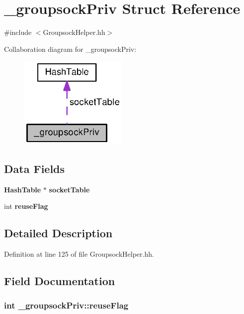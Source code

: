 \section{\+\_\+groupsock\+Priv Struct Reference}
\label{struct__groupsockPriv}


{\ttfamily \#include $<$Groupsock\+Helper.\+hh$>$}



Collaboration diagram for \+\_\+groupsock\+Priv\+:
\nopagebreak
\begin{figure}[H]
\begin{center}
\leavevmode
\includegraphics[width=148pt]{struct__groupsockPriv__coll__graph}
\end{center}
\end{figure}
\subsection*{Data Fields}
\begin{DoxyCompactItemize}
\item 
{\bf Hash\+Table} $\ast$ {\bf socket\+Table}
\item 
int {\bf reuse\+Flag}
\end{DoxyCompactItemize}


\subsection{Detailed Description}


Definition at line 125 of file Groupsock\+Helper.\+hh.



\subsection{Field Documentation}
\subsubsection[{reuse\+Flag}]{\setlength{\rightskip}{0pt plus 5cm}int \+\_\+groupsock\+Priv\+::reuse\+Flag}\label{struct__groupsockPriv_a8789defe3a6f26c0a69b4695c8c9d5ed}


